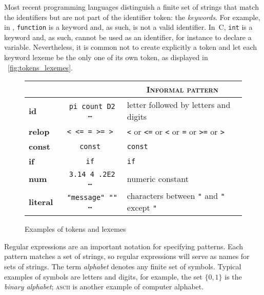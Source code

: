 Most recent programming languages distinguish a finite set of strings
that match the identifiers but are not part of the identifier token:
the \emph{keywords}. For example, in \Ada, \texttt{function} is a
keyword and, as such, is not a valid identifier. In~C, \texttt{int} is
a keyword and, as such, cannot be used as an identifier, for instance
to declare a variable. Nevertheless, it is common not to create
explicitly a  token and let each keyword lexeme be
the only one of its own token, as displayed in
\fig~\vref{fig:tokens_lexemes}.
\begin{figure}
\centering
\begin{tabular}{@{}>{\bfseries\sffamily}l|>{\tt}c|l@{}}
\toprule
  \multicolumn{1}{c}{\textsc{Token}}
& \multicolumn{1}{c}{\textsc{Sample lexemes}} 
& \multicolumn{1}{c}{\textsc{Informal pattern}}\\
\midrule
id       & pi count D2 \dots & letter followed by letters and digits\\
relop    & < <= = >= >   & \texttt{<} or \texttt{<=} or \texttt{<} or \texttt{=} or \texttt{>=} or \texttt{>}\\
const    & const         & \texttt{const}\\
if       & if            & \texttt{if}\\
num      & 3.14 4 .2E2 \ldots  & numeric constant\\
literal  & "message" ""  \ldots & characters between \texttt{"} and \texttt{"} except \texttt{"}\\
\bottomrule
\end{tabular}
\caption{Examples of tokens and lexemes\label{fig:tokens_lexemes}}
\end{figure}

Regular expressions are an important notation for specifying
patterns. Each pattern matches a set of strings, so regular
expressions will serve as names for sets of strings. The term
\emph{alphabet} denotes any finite set of symbols. Typical examples of
symbols are letters and digits, for example, the set \(\{0, 1\}\) is
the \emph{binary alphabet}; \textsc{ascii} is another example of
computer alphabet.

